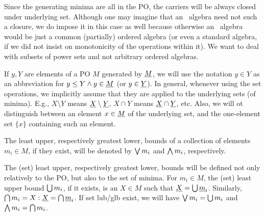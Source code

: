Since the generating minima are all in the PO,
the carriers will be always closed under underlying set. Although one
may imagine that an
\SSs\ algebra need not such a closure, we do impose it in this case as
well because otherwise an
\SSs\ algebra would be just a common (partially) ordered algebra (or
even a standard algebra, if we did not insist on monotonicity of the
operations within it). We want to deal with subsets of power sets and
not arbitrary ordered algebras.

If $y,Y$ are elements of a PO $M$ generated by $\underline {M}$, we will use
the notation $y\in Y$ as an abbreviation for $y\leq Y\land y\in\underline {M}$ (or $y\in\underline {Y}$). In general, whenever using the set operations,
we implicitly assume that they are applied to the underlying sets (of
minima). E.g., $X\setminus Y$ means $\underline {X}\setminus\underline {Y}$,
$X\cap Y$ means $\underline {X}\cap\underline {Y}$, etc. Also, we will ot
distinguish between an element $x\in\underline {M}$ of the underlying set,
and the one-element set $\{x\}$ containing such an element.

The least upper, respectively greatest lower, bounds of a collection of
elements $m_i\in M$, if they exist, will be denoted by $\bigvee m_i$
and $\bigwedge m_i$, respectively.

The (set) least upper, respectively greatest lower, bounds will be
defined not only relatively to the PO, but also to the set of
minima. For $m_i\in M$, the (set) least upper bound $\bigcup m_i$, if
it exists, is an $X\in M$ such that $\underline {X} = \bigcup\underline {m}_i$. Similarly, $\bigcap m_i = X : \underline {X} = \bigcap \underline {m}_i$. If
 set lub/glb exist, we will have $\bigvee m_i =
\bigcup m_i$ and $\bigwedge m_i = \bigcap m_i$.


